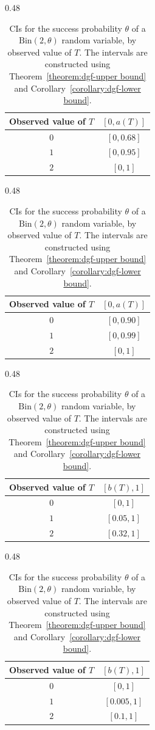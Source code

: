 \begin{table}[ht]
	\centering
	
	\begin{subtable}[t]{0.48\textwidth}
		\centering
		\begin{tabular}{c|c}
			Observed value of \(T\) & $\left[0, a(T)\right]$ \\
			\hline
			\(0\) & \([0, 0.68]\) \\
			\(1\) & \([0, 0.95]\) \\
			\(2\) & \([0, 1]\)
		\end{tabular}
		\caption{Upper \(90\%\)-CIs}
		\label{tab:upper-CB-example-0.9}
	\end{subtable}
	\hfill
	\begin{subtable}[t]{0.48\textwidth}
		\centering
		\begin{tabular}{c|c}
			Observed value of \(T\) &  $\left[0, a(T)\right]$ \\
			\hline
			\(0\) & \([0, 0.90]\) \\
			\(1\) & \([0, 0.99]\) \\
			\(2\) & \([0, 1]\)
		\end{tabular}
		\caption{Upper \(99\%\)-CIs}
		\label{tab:upper-CB-example-0.99}
	\end{subtable}
	
	\medskip
	
	\begin{subtable}[t]{0.48\textwidth}
		\centering
		\begin{tabular}{c|c}
			Observed value of \(T\) & $[b(T), 1]$ \\
			\hline
			\(0\) & \([0, 1]\) \\
			\(1\) & \([0.05, 1]\) \\
			\(2\) & \([0.32, 1]\)
		\end{tabular}
		\caption{Lower \(90\%\)-CIs}
		\label{tab:lower-CB-example-0.9}
	\end{subtable}
	\hfill
	\begin{subtable}[t]{0.48\textwidth}
		\centering
		\begin{tabular}{c|c}
			Observed value of \(T\) & $[b(T), 1]$ \\
			\hline
			\(0\) & \([0, 1]\) \\
			\(1\) & \([0.005, 1]\) \\
			\(2\) & \([0.1, 1]\)
		\end{tabular}
		\caption{Lower \(99\%\)-CIs}
		\label{tab:lower-CB-example-0.99}
	\end{subtable}
	
	\caption{CIs for the success probability \(\theta\) of a
		\(\mathrm{Bin}(2,\theta)\) random variable, by observed value of \(T\).
		The intervals are constructed using Theorem~\ref{theorem:dgf-upper bound} and Corollary~\ref{corollary:dgf-lower bound}.}
	\label{tab:CB-examples}
\end{table}



